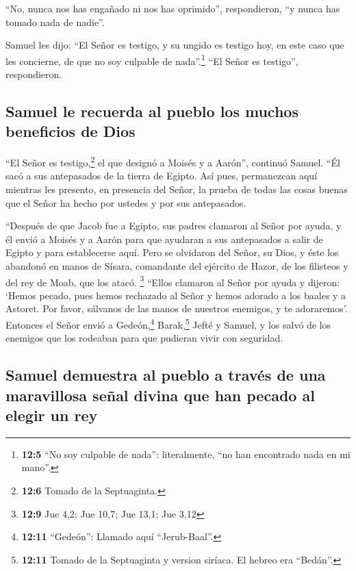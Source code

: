  ``No, nunca nos has engañado ni nos has oprimido'',
respondieron, ``y nunca has tomado nada de nadie''.

 Samuel les dijo: ``El Señor es testigo, y su ungido es
testigo hoy, en este caso que les concierne, de que no soy culpable de
nada''.\footnote{\textbf{12:5} ``No soy culpable de nada'':
  literalmente, ``no han encontrado nada en mi mano''.} ``El Señor es
testigo'', respondieron.

\hypertarget{samuel-le-recuerda-al-pueblo-los-muchos-beneficios-de-dios}{%
\subsection{Samuel le recuerda al pueblo los muchos beneficios de
Dios}\label{samuel-le-recuerda-al-pueblo-los-muchos-beneficios-de-dios}}

 ``El Señor es testigo,\footnote{\textbf{12:6} Tomado de
  la Septuaginta.} el que designó a Moisés y a Aarón'', continuó Samuel.
``Él sacó a sus antepasados de la tierra de Egipto.  Así
pues, permanezcan aquí mientras les presento, en presencia del Señor, la
prueba de todas las cosas buenas que el Señor ha hecho por ustedes y por
sus antepasados.

 ``Después de que Jacob fue a Egipto, sus padres clamaron
al Señor por ayuda, y él envió a Moisés y a Aarón para que ayudaran a
sus antepasados a salir de Egipto y para establecerse aquí.
 Pero se olvidaron del Señor, su Dios, y éste los abandonó
en manos de Sísara, comandante del ejército de Hazor, de los filisteos y
del rey de Moab, que los atacó. \footnote{\textbf{12:9} Jue 4,2; Jue
  10,7; Jue 13,1; Jue 3,12}  ``Ellos clamaron al Señor
por ayuda y dijeron: `Hemos pecado, pues hemos rechazado al Señor y
hemos adorado a los baales y a Astoret. Por favor, sálvanos de las manos
de nuestros enemigos, y te adoraremos'.  Entonces el
Señor envió a Gedeón,\footnote{\textbf{12:11} ``Gedeón'': Llamado aquí
  ``Jerub-Baal''.} Barak,\footnote{\textbf{12:11} Tomado de la
  Septuaginta y version siríaca. El hebreo era ``Bedán''.} Jefté y
Samuel, y los salvó de los enemigos que los rodeaban para que pudieran
vivir con seguridad.

\hypertarget{samuel-demuestra-al-pueblo-a-travuxe9s-de-una-maravillosa-seuxf1al-divina-que-han-pecado-al-elegir-un-rey}{%
\subsection{Samuel demuestra al pueblo a través de una maravillosa señal
divina que han pecado al elegir un
rey}\label{samuel-demuestra-al-pueblo-a-travuxe9s-de-una-maravillosa-seuxf1al-divina-que-han-pecado-al-elegir-un-rey}}

